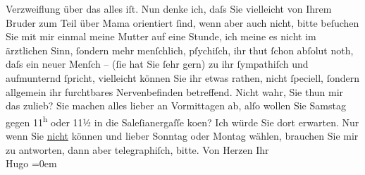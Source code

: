 \begin{ledgroupsized}[t]{13cm}
               Verzweiflung über das alles iſt.\pend
           \pstart
           Nun denke ich, daſs Sie vielleicht von Ihrem Bruder zum Teil über Mama orientiert ſind, wenn aber auch nicht, bitte {\pb}beſuchen Sie mit mir einmal meine
                  Mutter auf eine Stunde, ich
               meine es nicht im ärztlichen Sinn, ſondern mehr menſchlich, pſychiſch, ihr thut ſchon
               abſolut noth, daſs ein neuer Menſch – (ſie hat Sie ſehr gern) zu ihr ſympathiſch und
               aufmunternd ſpricht, vielleicht können Sie ihr etwas rathen, nicht ſpeciell, ſondern
               allgemein ihr furchtbares Nervenbefinden betreffend.\pend
           \pstart
           Nicht wahr, Sie thun mir {\pb}das
               zulieb?\pend
           \pstart
           Sie machen alles lieber an Vormittagen ab, alſo wollen Sie Samstag gegen
                     11\textsuperscript{h} oder 11½ in die Saleſianergaſſe
                  ko{\geminationm}en?\pend
           \pstart
           Ich würde Sie dort erwarten. Nur wenn Sie \uline{nicht}
               können und lieber Sonntag oder Montag wählen, brauchen Sie
               mir zu antworten, dann {\pb}aber
               telegraphiſch, bitte.\pend
           \pstart
           Von Herzen Ihr{\\[\baselineskip]}\spacefill\mbox{Hugo}\pend
           \leftskip=0em{}
         
         \endnumbering{}\end{ledgroupsized}  \newcommand{\dateiname}{L01380}\newcommand{\titel}{Hugo von Hofmannsthal an Arthur Schnitzler, [9. 3. 1904]}\newcommand{\editorInnen}{Martin Anton Müller und Gerd-Hermann Susen}
      